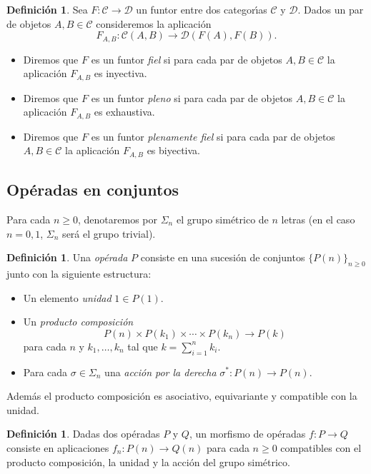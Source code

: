 \documentclass[11pt,a4paper,openright,oneside]{article}
\numberwithin{equation}{section}
\theoremstyle{definition}
\newtheorem{defi}[teo]{Definici\'on}
\begin{document}
\begin{defi}
    Sea $F: \mathcal{C}\to \mathcal{D}$ un funtor entre dos categor\'{\i}as $\mathcal{C}$ y $\mathcal{D}$. Dados un par de objetos $A,B\in\mathcal{C}$ consideremos la aplicaci\'on
    $$
        F_{A,B}\colon \mathcal{C}(A,B)\longrightarrow\mathcal{D}(F(A), F(B)).
    $$
    \begin{itemize}
        \item Diremos que $F$ es un funtor \emph{fiel} si para cada par de objetos $A, B\in\mathcal{C}$ la aplicaci\'on $F_{A,B}$ es inyectiva.
        \item Diremos que $F$ es un funtor \emph{pleno} si para cada par de objetos $A, B\in\mathcal{C}$ la aplicaci\'on $F_{A,B}$ es exhaustiva.
        \item Diremos que $F$ es un funtor \emph{plenamente fiel} si para cada par de objetos $A, B\in\mathcal{C}$ la aplicaci\'on $F_{A,B}$ es biyectiva.
    \end{itemize}
\end{defi}
\subsection{Op\'eradas en conjuntos}
Para cada $n\ge 0$, denotaremos por $\Sigma_n$ el grupo sim\'etrico de $n$ letras (en el caso $n=0,1$, $\Sigma_n$ ser\'a el grupo trivial).
\begin{defi}
    Una \emph{op\'erada} $P$ consiste en una sucesi\'on de conjuntos $\{P(n)\}_{n\ge 0}$ junto con la siguiente estructura:
    \begin{itemize}
        \item Un elemento \emph{unidad} $1\in P(1)$.
        \item Un \emph{producto composici\'on}
              $$
                  P(n)\times P(k_1) \times\cdots\times P(k_n)\longrightarrow P(k)
              $$
              para cada $n$ y $k_1,\dots,k_n$ tal que $k=\sum_{i=1}^{n}{k_i}$.
        \item Para cada $\sigma\in\Sigma_n$ una \emph{acci\'on por la derecha} $\sigma^*\colon P(n)\to P(n)$.
    \end{itemize}
    Adem\'as el producto composici\'on es asociativo, equivariante y compatible con la unidad.
\end{defi}

\begin{defi}
    Dadas dos op\'eradas $P$ y $Q$, un morfismo de op\'eradas $f\colon P\to Q$ consiste en aplicaciones $f_n\colon P(n)\to Q(n)$ para cada $n\ge 0$ compatibles con el producto composici\'on, la unidad y la acci\'on del grupo sim\'etrico.
\end{defi}
\end{document}
